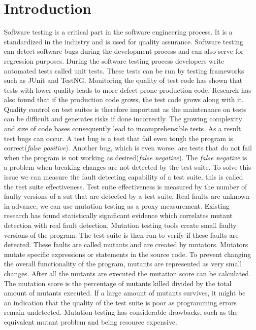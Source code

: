 \documentclass[../main]{subfiles}
\begin{document}
\chapter{Introduction}
\label{ch:introduction}
Software testing is a critical part in the software engineering process. 
It is a standardized in the industry and is used for quality assurance\cite{ISOtesting}. 
Software testing can detect software bugs during the development process and can also serve for regression purposes\cite{Bertolino2007SoftwareDreams}. 
During the software testing process developers write automated tests called unit tests. 
These tests can be run by testing frameworks such as JUnit and TestNG\cite{JUnit, TestNG}.
Monitoring the quality of test code has shown that tests with lower quality leads to more defect-prone production code\cite{Spadini2018OnQuality}. 
Research has also found that if the production code grows, the test code grows along with it\cite{Zaidman2008MiningCode}. 
Quality control on test suites is therefore important as the maintenance on tests can be difficult and generates risks if done incorrectly\cite{Horvath2015TestMetrics}.
\newline
The growing complexity and size of code bases consequently lead to incomprehensible tests.
As a result test bugs can occur. 
A test bug is a test that fail even tough the program is correct(\textit{false positive}). 
Another bug, which is even worse, are tests that do not fail when the program is not working as desired(\textit{false negative}).
The \textit{false negative} is a problem when breaking changes are not detected by the test suite.
\newline
To solve this issue we can measure the fault detecting capability of a test suite, this is called the test suite effectiveness.
Test suite effectiveness is measured by the number of faulty versions of a \acrfull{sut} that are detected by a test suite.
Real faults are unknown in advance, we can use mutation testing as a proxy measurement. 
Existing research has found statistically significant evidence which correlates mutant detection with real fault detection\cite{Just2014AreTesting}.
\newline
Mutation testing tools create small faulty versions of the program.
The test suite is then run to verify if these faults are detected.
These faults are called mutants and are created by mutators.
Mutators mutate specific expressions or statements in the source code. 
To prevent changing the overall functionality of the program, mutants are represented as very small changes\cite{Lipton1978HintsProgrammer}.
\newline
After all the mutants are executed the mutation score can be calculated. 
The mutation score is the percentage of mutants killed divided by the total amount of mutants executed.
If a large amount of mutants survives, it might be an indication that the quality of the test suite is poor as programming errors remain undetected.
Mutation testing has considerable drawbacks\cite{Pizzoleto2019}, such as the equivalent mutant problem and being resource expensive.
\end{document}
